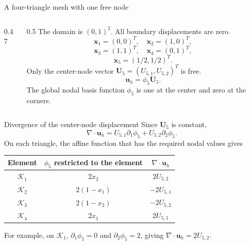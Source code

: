 \documentclass[11pt,aspectratio=169]{beamer}
\newcommand{\bu}{\bm u}
\newcommand{\bx}{\bm x}
\newcommand{\divg}{\nabla\!\cdot}
\begin{document}
\begin{frame}{A four-triangle mesh with one free node}
\begin{columns}[c,onlytextwidth]
\begin{column}{0.47\textwidth}
\centering
{}
\end{column}
\begin{column}{0.5\textwidth}
The domain is $(0,1)^2$. All boundary displacements are zero.
\[
\bx_1=(0,0)^T,\quad\bx_2=(1,0)^T,
\]
\[
\bx_3=(1,1)^T,\quad\bx_4=(0,1)^T,
\]
\[
\bx_5=(1/2,1/2)^T.
\]
Only the center-node vector $\bm U_5=(U_{5,1},U_{5,2})^T$ is free.
\[
\bu_h=\phi_5\bm U_5.
\]
The global nodal basis function $\phi_5$ is one at the center and zero at
the corners.
\end{column}
\end{columns}
\end{frame}

\begin{frame}{Divergence of the center-node displacement}
Since $\bm U_5$ is constant,
\[
\divg\bu_h=U_{5,1}\partial_1\phi_5+U_{5,2}\partial_2\phi_5.
\]
On each triangle, the affine function that has the required nodal values gives
\begin{center}
\begin{tabular}{ccc}
\toprule
Element & $\phi_5$ restricted to the element & $\divg\bu_h$\\
\midrule
$\mathcal K_1$ & $2x_2$ & $2U_{5,2}$\\[0.15em]
$\mathcal K_2$ & $2(1-x_1)$ & $-2U_{5,1}$\\[0.15em]
$\mathcal K_3$ & $2(1-x_2)$ & $-2U_{5,2}$\\[0.15em]
$\mathcal K_4$ & $2x_1$ & $2U_{5,1}$\\
\bottomrule
\end{tabular}
\end{center}
For example, on $\mathcal K_1$, $\partial_1\phi_5=0$ and
$\partial_2\phi_5=2$, giving $\divg\bu_h=2U_{5,2}$.
\end{frame}
\end{document}

